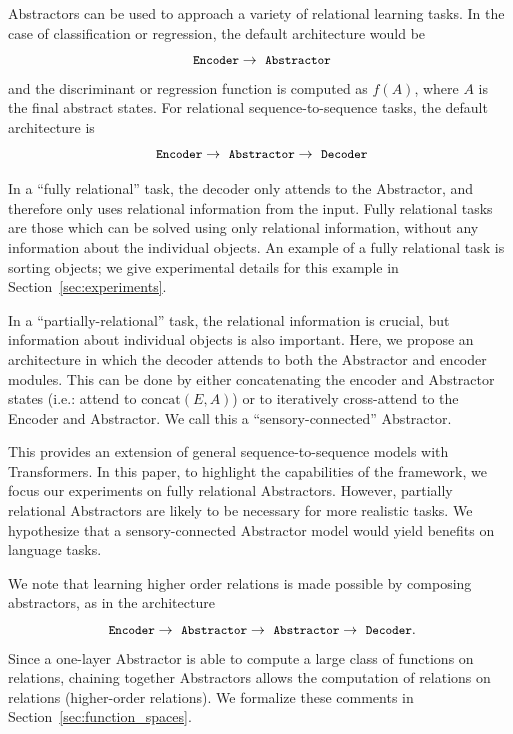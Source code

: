 Abstractors can be used to approach a variety of relational learning tasks. In the case of classification
or regression, the default architecture would be
$$\module{Encoder} \rightarrow \module{Abstractor}$$
and the discriminant or regression function is computed as $f(A)$, where $A$ is the final abstract states.
For relational sequence-to-sequence tasks, the default architecture is
$$\module{Encoder} \rightarrow \module{Abstractor} \rightarrow \module{Decoder}$$

In a ``fully relational'' task, the decoder only attends to the Abstractor, and therefore only uses relational information from the input. Fully relational tasks are those which can be solved using only relational information, without any information about the individual objects. An example of a fully relational task is sorting objects; we give experimental details for this example in Section~\ref{sec:experiments}.

In a ``partially-relational'' task, the relational information is crucial, but information about individual objects is also important. Here, we propose an architecture in which the decoder attends to both the Abstractor and encoder modules. This can be done by either concatenating the encoder and Abstractor states (i.e.: attend to $\text{concat}(E, A)$) or to iteratively cross-attend to the Encoder and Abstractor. We call this a ``sensory-connected'' Abstractor.

This provides an extension of general sequence-to-sequence models with Transformers. In this paper, to highlight the capabilities of the framework, we focus our experiments on fully relational Abstractors. However, partially relational Abstractors are likely to be necessary for more realistic tasks. We hypothesize that a sensory-connected Abstractor model would yield benefits on language tasks.

We note that learning higher order relations is made possible by composing
abstractors, as in the architecture
\begin{equation*}\module{Encoder} \rightarrow \module{Abstractor} \rightarrow \module{Abstractor} \rightarrow \module{Decoder}.
\end{equation*}
Since a one-layer Abstractor is able to compute a large class of functions on relations, chaining together Abstractors allows the computation of relations on relations (higher-order relations). We formalize these comments in Section~\ref{sec:function_spaces}.

